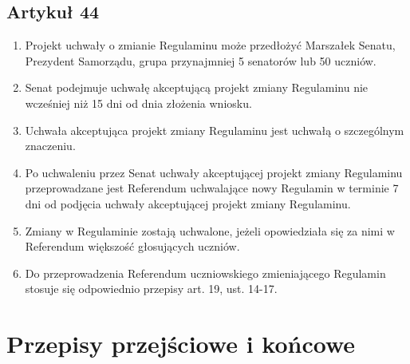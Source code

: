 \documentclass[14pt]{article}
\newenvironment{ustepy}{%
	\begin{enumerate}[leftmargin=1.5em, itemindent=1pt, labelwidth=1em, itemsep=5pt]
	}{%
	\end{enumerate}
}
\begin{document}
\subsection*{Artykuł 44}
\begin{ustepy}
	\item Projekt uchwały o zmianie Regulaminu może przedłożyć Marszałek Senatu, Prezydent Samorządu, grupa przynajmniej 5 senatorów lub 50 uczniów.
	\item Senat podejmuje uchwałę akceptującą projekt zmiany Regulaminu nie wcześniej niż 15 dni od dnia złożenia wniosku.
	\item Uchwała akceptująca projekt zmiany Regulaminu jest uchwałą o szczególnym znaczeniu.
	\item Po uchwaleniu przez Senat uchwały akceptującej projekt zmiany Regulaminu przeprowadzane jest Referendum uchwalające nowy Regulamin w terminie 7 dni od podjęcia uchwały akceptującej projekt zmiany Regulaminu.
	\item Zmiany w Regulaminie zostają uchwalone, jeżeli opowiedziała się za nimi w Referendum większość głosujących uczniów.
	\item Do przeprowadzenia Referendum uczniowskiego zmieniającego Regulamin stosuje się odpowiednio przepisy art. 19, ust. 14-17.
\end{ustepy}
\newpage
\section{Przepisy przejściowe i końcowe}
\end{document}
